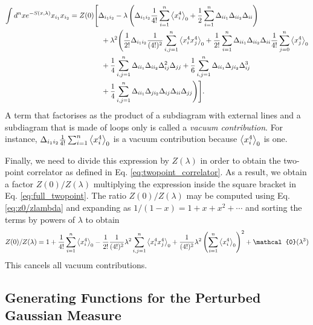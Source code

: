 \documentclass{article}
\numberwithin{equation}{section}
\begin{document}
\begin{itemize}
    \begin{equation} \label{eq:full_twopoint}
    \begin{aligned}
        \int d^nx e^{-S(x, \lambda)} x_{i_1} x_{i_2} = Z(0) &\Biggl[ \Delta_{i_1 i_2} - \lambda \left(\Delta_{i_1 i_2} \frac{1}{4!} \sum_{i=1}^n \ev{x_i^4}_0 + \frac{1}{2} \sum_{i=1}^n \Delta_{ii_1} \Delta_{ii_2} \Delta_{ii}\right) \\
        &\quad + \lambda^2\Biggl( \frac{1}{2!}\Delta_{i_1 i_2} \frac{1}{(4!)^2} \sum_{i,j=1}^n \ev{x_i^4 x_j^4}_0 + \frac{1}{2!}\sum_{i=1}^n \Delta_{ii_1} \Delta_{ii_2} \Delta_{ii} \frac{1}{4!}\sum_{j=0}^n \ev{x_j^4}_0 \\
        &\quad + \frac{1}{4} \sum_{i,j=1}^n \Delta_{ii_1} \Delta_{ii_2} \Delta_{ij}^2 \Delta_{jj} + \frac{1}{6} \sum_{i,j=1}^n \Delta_{ii_1} \Delta_{ji_2} \Delta_{ij}^3 \\
        &\quad + \frac{1}{4} \sum_{i,j=1}^n \Delta_{ii_1} \Delta_{ji_2} \Delta_{ij} \Delta_{ii } \Delta_{jj} \Biggr)\Biggr].
    \end{aligned}
    \end{equation}
    A term that factorises as the product of a subdiagram with external lines and a subdiagram that is made of loops only is called a \textit{vacuum contribution}. For instance, $\Delta_{i_1 i_2} \frac{1}{4!} \sum_{i=1}^n \ev{x_i^4}_0$ is a vacuum contribution because $\ev{x_i^4}_0$ is one. 

    Finally, we need to divide this expression by $Z(\lambda)$ in order to obtain the two-point correlator as defined in Eq. \ref{eq:twopoint_correlator}. As a result, we obtain a factor $Z(0)/Z(\lambda)$ multiplying the expression inside the square bracket in Eq. \ref{eq:full_twopoint}. The ratio $Z(0)/Z(\lambda)$ may be computed using Eq. \ref{eq:z0/zlambda} and expanding as $1/(1-x) = 1 + x + x^2 + \cdots$ and sorting the terms by powers of $\lambda$ to obtain
    \begin{equation}
        Z(0)/Z(\lambda) = 1 + \frac{1}{4!} \sum_{i=1}^n \ev{x_i^4}_0 - \frac{1}{2!} \frac{1}{(4!)^2} \lambda^2 \sum_{i,j=1}^n \ev{x_i^4 x_j^4}_0 + \frac{1}{(4!)^2} \lambda^2 \left(\sum_{i=1}^n \ev{x_i^4}_0 \right)^2 + \mathcal{0}(\lambda^3)
    \end{equation}
    This cancels all vacuum contributions. %
\end{itemize}

\subsection{Generating Functions for the Perturbed Gaussian Measure}
\end{document}
